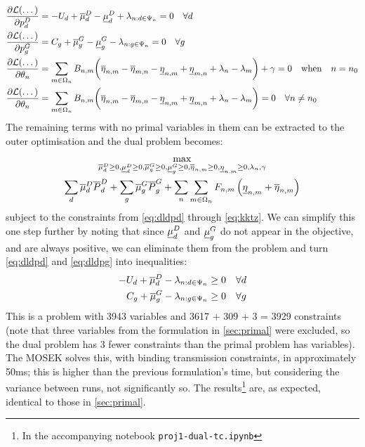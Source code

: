 \documentclass[11pt,a4paper]{article}
\numberwithin{equation}{section}
\begin{document}
\begin{align}
\frac{\partial \mathcal{L}(\dots) }{\partial p^D_d} &= - U_d + \overline{\mu}_d^D - \underline{\mu}_d^D + \lambda_{n:d \in \Psi_n} = 0 \quad \forall d \label{eq:dldpd} \\
\frac{\partial \mathcal{L}(\dots) }{\partial p^G_g} &= C_g + \overline{\mu}_g^G - \underline{\mu}_g^G - \lambda_{n:g \in \Psi_n} = 0 \quad \forall g \label{eq:dldpg}\\
\frac{\partial \mathcal{L}(\dots) }{\partial \theta_n} &= \sum_{m \in \Omega_n} B_{n,m} \biggl( 
\overline{\eta}_{n,m} - \overline{\eta}_{m,n} - \underline{\eta}_{n,m} + \underline{\eta}_{m,n} + \lambda_n - \lambda_m
\biggr) + \gamma = 0\quad \text{when} \quad n = n_0\\	
\frac{\partial \mathcal{L}(\dots) }{\partial \theta_n} &= \sum_{m \in \Omega_n} B_{n,m} \biggl( 
\overline{\eta}_{n,m} - \overline{\eta}_{m,n} - \underline{\eta}_{n,m} + \underline{\eta}_{m,n} + \lambda_n - \lambda_m
\biggr) = 0 \quad \forall n \neq n_0 \label{eq:kktz}
\end{align}
The remaining terms with no primal variables in them can be extracted to the outer optimisation and the dual problem becomes:
\begin{multline}
\max_{\overline{\mu}_d^D \geq 0, \underline{\mu}_d^D \geq 0, \overline{\mu}_g^G \geq 0, \underline{\mu}_g^G \geq 0, \overline{\eta}_{n,m} \geq 0, \underline{\eta}_{n,m} \geq 0, \lambda_n, \gamma} \\
\sum_d \overline{\mu}_d^D \overline{P}^D_d + \sum_g \overline{\mu}_g^G \overline{P}^G_g 
+ \sum_n \sum_{m \in \Omega_n} F_{n,m} \left( \underline{\eta}_{n,m} + \overline{\eta}_{n,m} \right)
\end{multline}
subject to the constraints from \cref{eq:dldpd} through \cref{eq:kktz}.
We can simplify this one step further by noting that since $\underline{\mu}_d^D$ and $\underline{\mu}_g^G$ do not appear in the objective, and are always positive, we can eliminate them from the problem and turn \cref{eq:dldpd} and \cref{eq:dldpg} into inequalities:
\begin{align}
- U_d + \overline{\mu}_d^D - \lambda_{n:d \in \Psi_n} &\geq 0 \quad \forall d  \\
C_g + \overline{\mu}_g^G - \lambda_{n:g \in \Psi_n} &\geq 0 \quad \forall g
\end{align}
This is a problem with 3943 variables and 3617 + 309 + 3 = 3929 constraints (note that three variables from the formulation in \cref{sec:primal} were excluded, so the dual problem has 3 fewer constraints than the primal problem has variables).
The MOSEK solves this, with binding transmission constraints, in approximately 50ms; this is higher than the previous formulation's time, but considering the variance between runs, not significantly so.
The results\footnote{
In the accompanying notebook \texttt{proj1-dual-tc.ipynb}
} are, as expected, identical to those in \cref{sec:primal}.
\end{document}
